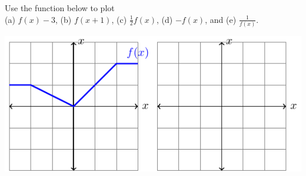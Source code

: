 \begin{exercises}
\item Use the function below to plot \\
    (a) $f(x)-3$, \quad (b) $f(x+1)$, \quad (c) $\frac{1}{2}f(x)$, \quad (d) $-f(x)$,
    \quad and (e) $\frac{1}{f(x)}$. 
    \begin{center}
        \includegraphics[width=0.7\columnwidth]{figures/0-3-fig8.pdf}
    \end{center}
\begin{exerciseSolution}
\end{exerciseSolution}


\end{exercises}
\afterexercises

